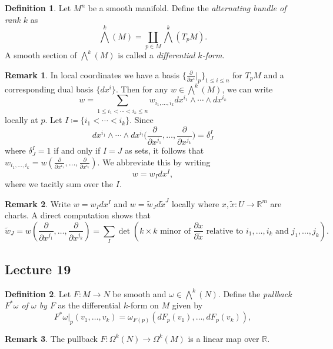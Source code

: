 \documentclass[10pt,letterpaper,cm]{nupset}
\theoremstyle{definition}
\newtheorem*{definition}{Definition}
\newtheorem{remark}{Remark}
\newcommand{\R}{\mathbb R}
\newcommand{\1}{\mathbf{1}}
\newcommand{\0}{\vec 0}
\begin{document}
\begin{definition}
Let $M^n$ be a smooth manifold. Define the \textit{alternating bundle of rank $k$} as $$\bigwedge^k(M) = \coprod_{p\in M} \bigwedge^k(T_pM).  $$ A smooth section of $\bigwedge^k(M)$ is called a \textit{differential $k$-form}.
\end{definition}

\begin{remark}
In local coordinates we have a basis $\{\frac{\partial}{\partial{x^i}}\rvert_p\}_{1\leq i \leq n}$ for $T_pM$ and a corresponding dual basis $\{dx^i\}$. Then for any $w \in \bigwedge^k(M)$, we can write $$ w = \sum_{1\leq i_1 < \cdots < i_k \leq n}w_{i_1, \ldots, i_k} dx^{i_1} \wedge \cdots \wedge dx^{i_k} $$ locally at $p$. Let $I\coloneqq  \{i_1 < \cdots < i_k\}$. Since $$dx^{i_1} \wedge \cdots \wedge dx^{i_l}\big( \frac{\partial}{\partial{x^{j_1}}}, \ldots, \frac{\partial}{\partial{x^{j_k}}} \big) = \delta^I_J$$ where $\delta^I_J = 1$ if and only if $I = J$ as sets, it follows that
$w_{i_1, \ldots, i_k}  = w(\frac{\partial}{\partial{x^{i_1}}}, \ldots, \frac{\partial}{\partial{x^{i_k}}}).$ We abbreviate this by writing $$w = w_I dx^I,$$ where we tacitly sum over the $I$.
\end{remark}

\begin{remark}
Write $w = w_Idx^I$ and $ w= \tilde{w}_J d\tilde{x}^J$ locally where $x, \tilde{x}: U \to \R^m$ are charts. A direct computation shows that $$\tilde{w}_J = w(\frac{\partial}{\partial{x^{j_1}}}, \ldots,  \frac{\partial}{\partial{x^{j_k}}}) = \sum_I \det(k \times k \text{ minor of }\frac{\partial{x}}{\partial{\tilde{x}}} \text{ relative to } i_1, \ldots, i_k \text{ and }j_1, \ldots, j_k). $$
\end{remark}

\subsection{Lecture 19}

\begin{definition}
Let $F: M \to N$ be smooth and $\omega \in \bigwedge^k(N)$. Define the \textit{pullback $F^{\ast}\omega$ of $\omega$ by $F$} as the differential $k$-form on $M$ given by $$F^{\ast} \omega\rvert_p(v_1, \ldots, v_k) = \omega_{F(p)}(dF_p(v_1), \ldots, dF_p(v_k)),$$
\end{definition}

\begin{remark}
The pullback $F : \Omega^k(N) \to \Omega^k(M)$ is a linear map over $\R$. 
\end{remark}
\end{document}
